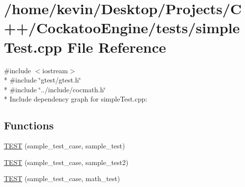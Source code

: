 \hypertarget{a00008}{}\section{/home/kevin/\+Desktop/\+Projects/\+C++/\+Cockatoo\+Engine/tests/simple\+Test.cpp File Reference}
\label{a00008}
{\ttfamily \#include $<$iostream$>$}\\*
{\ttfamily \#include \char`\"{}gtest/gtest.\+h\char`\"{}}\\*
{\ttfamily \#include \char`\"{}../include/cocmath.\+h\char`\"{}}\\*
Include dependency graph for simple\+Test.\+cpp\+:
\subsection*{Functions}
\begin{DoxyCompactItemize}
\item 
\hyperlink{a00009_ga4544944d70c542ac9f7e21a8c0c1dfea}{T\+E\+ST} (sample\+\_\+test\+\_\+case, sample\+\_\+test)
\item 
\hyperlink{a00009_ga69e4845ad83d95bf423b224d79afd8d8}{T\+E\+ST} (sample\+\_\+test\+\_\+case, sample\+\_\+test2)
\item 
\hyperlink{a00009_gab57cc19cd7c5f3f765da893b317956cf}{T\+E\+ST} (sample\+\_\+test\+\_\+case, math\+\_\+test)
\end{DoxyCompactItemize}
